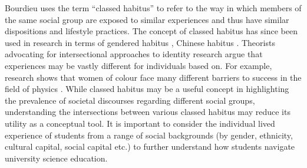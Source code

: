 Bourdieu uses the term ``classed habitus'' to refer to the way in which members of the same social group are exposed to similar experiences and thus have similar dispositions and lifestyle practices. The concept of classed habitus has since been used in research in terms of gendered habitus \citep{Reay_2004}, Chinese habitus \citep{Mu2014}. Theorists advocating for intersectional approaches to identity research argue that experiences may be vastly different for individuals based on. For example, research shows that women of colour face many different barriers to success in the field of physics \cite{ong2005body}. While classed habitus may be a useful concept in highlighting the prevalence of societal discourses regarding different social groups, understanding the intersections between various classed habitus may reduce its utility as a conceptual tool. It is important to consider the individual lived experience of students from a range of social backgrounds (by gender, ethnicity, cultural capital, social capital etc.) to further understand how students navigate university science education.

